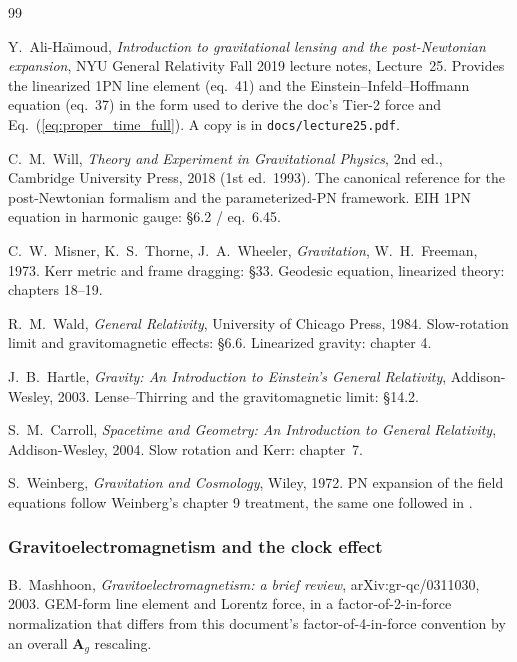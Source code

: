 \documentclass[11pt,a4paper]{article}
\newcommand{\vv}[1]{\mathbf{#1}}
\newcommand{\Ag}{\vv{A}_g}
\begin{document}
\begin{thebibliography}{99}\setlength{\itemsep}{2pt}\small

Y.~Ali-Ha\"\i moud, \emph{Introduction to gravitational lensing and the
post-Newtonian expansion}, NYU General Relativity Fall 2019 lecture
notes, Lecture~25.  Provides the linearized 1PN line element (eq.~41)
and the Einstein--Infeld--Hoffmann equation (eq.~37) in the form used
to derive the doc's Tier-2 force and Eq.~(\ref{eq:proper_time_full}).
A copy is in \texttt{docs/lecture25.pdf}.

C.~M.~Will, \emph{Theory and Experiment in Gravitational Physics},
2nd ed., Cambridge University Press, 2018 (1st ed.\ 1993).  The
canonical reference for the post-Newtonian formalism and the
parameterized-PN framework.  EIH 1PN equation in harmonic gauge:
\S6.2 / eq.~6.45.

C.~W.~Misner, K.~S.~Thorne, J.~A.~Wheeler, \emph{Gravitation},
W.~H.~Freeman, 1973.  Kerr metric and frame dragging: \S33.  Geodesic
equation, linearized theory: chapters 18--19.

R.~M.~Wald, \emph{General Relativity}, University of Chicago Press,
1984.  Slow-rotation limit and gravitomagnetic effects: \S6.6.
Linearized gravity: chapter 4.

J.~B.~Hartle, \emph{Gravity: An Introduction to Einstein's General
Relativity}, Addison-Wesley, 2003.  Lense--Thirring and the
gravitomagnetic limit: \S14.2.

S.~M.~Carroll, \emph{Spacetime and Geometry: An Introduction to
General Relativity}, Addison-Wesley, 2004.  Slow rotation and Kerr:
chapter~7.

S.~Weinberg, \emph{Gravitation and Cosmology}, Wiley, 1972.  PN
expansion of the field equations follow Weinberg's chapter 9
treatment, the same one followed in \cite{AliHaimoud2019}.

\subsubsection*{Gravitoelectromagnetism and the clock effect}

B.~Mashhoon, \emph{Gravitoelectromagnetism: a brief review},
arXiv:gr-qc/0311030, 2003.  GEM-form line element and Lorentz
force, in a factor-of-2-in-force normalization that differs from this
document's factor-of-4-in-force convention by an overall $\Ag$
rescaling.


\end{thebibliography}
\end{document}

